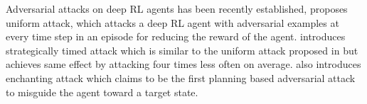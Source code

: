 Adversarial attacks on deep RL agents has been recently established, \cite{thirteen} proposes uniform attack, which attacks a deep RL agent with adversarial examples at every time step in an episode for reducing the reward of the agent. \cite{fourteen} introduces strategically timed attack which is similar to the uniform attack proposed in \cite{thirteen} but achieves same effect by attacking four times less often on average. \cite{fourteen} also introduces enchanting attack which claims to be the first planning based adversarial attack to misguide the agent toward a target state.

